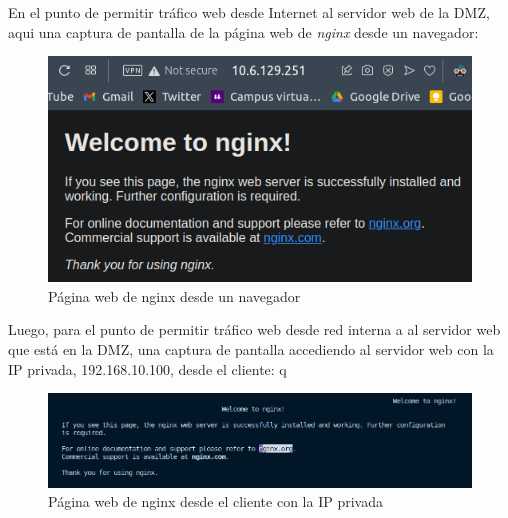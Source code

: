 \documentclass[11pt]{report} %
\begin{document}
En el punto de permitir tráfico web desde Internet al servidor web de la DMZ, aqui una captura de pantalla de la
página web de \emph{nginx} desde un navegador:

\begin{figure}[H]
  \centering
  \includegraphics[scale=0.55]{img/nginx_navegador.png}
  \caption{Página web de nginx desde un navegador}
  \label{fig:página web de nginx desde un navegador}
\end{figure}

\cleardoublepage

Luego, para el punto de permitir tráfico web desde red interna a al servidor web que está en la DMZ, una captura de pantalla
accediendo al servidor web con la IP privada, 192.168.10.100, desde el cliente:
q
\begin{figure}[H]
  \centering
  \includegraphics[scale=0.5]{img/nginx_cliente_privada.png}
  \caption{Página web de nginx desde el cliente con la IP privada}
  \label{fig:página web de nginx desde el cliente con la IP privada}
\end{figure}
\end{document}
